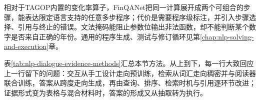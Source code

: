 相对于TAGOP内置的变化率算子，FinQANet把同一计算展开成两个可组合的步骤，能表达限定语言支持的任意多步程序；代价是需要程序级标注，并引入步骤选择、引用与终止的错误。文法掩码能阻止参数位输出非法函数，却不能判断某个数字是否来自正确的年份。通用的程序生成、测试与修订循环见第\ref{chap:nlp-solving-and-execution}章。

表\ref{tab:nlp-dialogue-evidence-methods}汇总本节方法。从上到下，每一行大致回应上一行留下的问题：交互从手工设计走向预训练，检索从词汇走向稠密并与阅读器联合训练，答案从跨度走向生成，再由查询、排序、检索时机与引用逐环节改进；证据形式变为表格与混合材料时，答案的形成又从抽取转为执行。

\FloatBarrier
